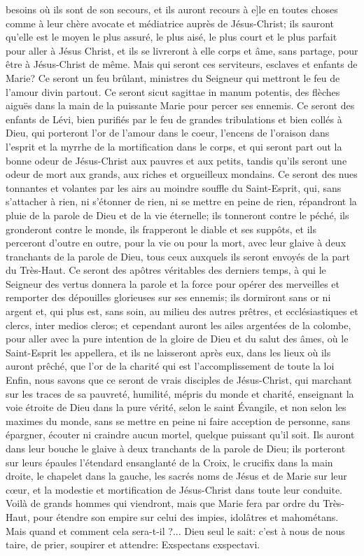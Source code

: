 besoins où ils sont de son secours, et ils auront recours à e]le en toutes choses comme à leur chère avocate et
médiatrice auprès de Jésus-Christ; ils sauront qu'elle est le moyen le plus assuré, le plus aisé, le plus court et le
plus parfait pour aller à Jésus Christ, et ils se livreront à elle corps et âme, sans partage, pour être à Jésus-Christ
de même.
 Mais qui seront ces serviteurs, esclaves et enfants de Marie?
Ce seront un feu brûlant, ministres du Seigneur qui mettront le feu de l'amour divin partout.
Ce seront sicut sagittae in manum potentis, des flèches aiguës dans la main de la puissante Marie pour percer ses
ennemis.
Ce seront des enfants de Lévi, bien purifiés par le feu de grandes tribulations et bien collés à Dieu, qui porteront
l'or de l'amour dans le coeur, l'encens de l'oraison dans l'esprit et la myrrhe de la mortification dans le corps, et qui
seront part out la bonne odeur de Jésus-Christ aux pauvres et aux petits, tandis qu'ils seront une odeur de mort
aux grands, aux riches et orgueilleux mondains.
 Ce seront des nues tonnantes et volantes par les airs au moindre souffle du Saint-Esprit, qui, sans s'attacher à
rien, ni s'étonner de rien, ni se mettre en peine de rien, répandront la pluie de la parole de Dieu et de la vie
éternelle; ils tonneront contre le péché, ils gronderont contre le monde, ils frapperont le diable et ses suppôts, et ils
perceront d'outre en outre, pour la vie ou pour la mort, avec leur glaive à deux tranchants de la parole de Dieu,
tous ceux auxquels ils seront envoyés de la part du Très-Haut.
 Ce seront des apôtres véritables des derniers temps, à qui le Seigneur des vertus donnera la parole et la force
pour opérer des merveilles et remporter des dépouilles glorieuses sur ses ennemis; ils dormiront sans or ni argent
et, qui plus est, sans soin, au milieu des autres prêtres, et ecclésiastiques et clercs, inter medios cleros; et
cependant auront les ailes argentées de la colombe, pour aller avec la pure intention de la gloire de Dieu et du
salut des âmes, où le Saint-Esprit les appellera, et ils ne laisseront après eux, dans les lieux où ils auront prêché,
que l'or de la charité qui est l'accomplissement de toute la loi
 Enfin, nous savons que ce seront de vrais disciples de Jésus-Christ, qui marchant sur les traces de sa
pauvreté, humilité, mépris du monde et charité, enseignant la voie étroite de Dieu dans la pure vérité, selon le saint
Évangile, et non selon les maximes du monde, sans se mettre en peine ni faire acception de personne, sans
épargner, écouter ni craindre aucun mortel, quelque puissant qu'il soit. Ils auront dans leur bouche le glaive à deux
tranchants de la parole de Dieu; ils porteront sur leurs épaules l'étendard ensanglanté de la Croix, le crucifix dans
la main droite, le chapelet dans la gauche, les sacrés noms de Jésus et de Marie sur leur cœur, et la modestie et
mortification de Jésus-Christ dans toute leur conduite.
Voilà de grands hommes qui viendront, mais que Marie fera par ordre du Très-Haut, pour étendre son empire sur
celui des impies, idolâtres et mahométans. Mais quand et comment cela sera-t-il ?... Dieu seul le sait: c'est à nous
de nous taire, de prier, soupirer et attendre: Exspectans exspectavi.

